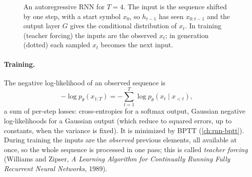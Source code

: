 \begin{notechapter}
\begin{figure}[ht]
\centering
{}
\caption{An autoregressive RNN for $T = 4$. The input is the sequence shifted by one step, with a start
symbol $x_0$, so $h_{t-1}$ has seen $x_{0:t-1}$ and the output layer $G$ gives the conditional distribution of $x_t$. In
training (teacher forcing) the inputs are the observed $x_t$; in generation (dotted) each sampled $x_t$
becomes the next input.}
\label{sequence-models:fig:autoregressive}
\end{figure}

\paragraph{Training.} The negative log-likelihood of an observed sequence is
\[
  -\log p_\theta(x_{1:T}) = -\sum_{t=1}^T\log p_\theta(x_t\mid x_{<t}),
\]
a sum of per-step losses: cross-entropies for a softmax output, Gaussian negative
log-likelihoods for a Gaussian output (which reduce to squared errors, up to constants, when
the variance is fixed). It is minimized by BPTT (\cref{ch:rnn-bptt}). During training the inputs are
the \emph{observed} previous elements, all available at once, so the whole sequence is
processed in one pass; this is called \emph{teacher forcing} (Williams and Zipser, \emph{A Learning
Algorithm for Continually Running Fully Recurrent Neural Networks}, 1989).


\end{notechapter}
